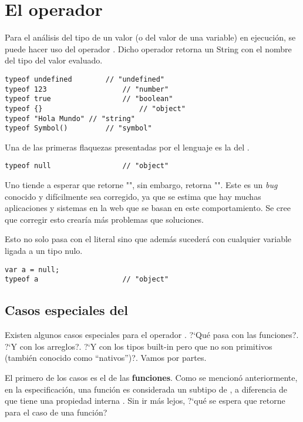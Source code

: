 \section{El operador }

Para el análisis del tipo de un valor (o del valor de una variable) en ejecución, se puede hacer uso del operador . Dicho operador retorna un String con el nombre del tipo del valor evaluado.

\begin{lstlisting}[title={Analizando los tipos con \code{typeof}}]
typeof undefined		// "undefined"
typeof 123					// "number"
typeof true					// "boolean"
typeof {}						// "object"
typeof "Hola Mundo" // "string"
typeof Symbol()			// "symbol"
\end{lstlisting}

Una de las primeras flaquezas presentadas por el lenguaje es la del . 

\begin{lstlisting}[title={Analizando \code{typeof null}}]
typeof null					// "object"
\end{lstlisting}

Uno tiende a esperar que  retorne "", sin embargo, retorna "". Este es un \textit{bug} conocido y difícilmente sea corregido, ya que se estima que hay muchas aplicaciones y sistemas en la web que se basan en este comportamiento. Se cree que corregir esto crearía más problemas que soluciones.

Esto no solo pasa con el literal  sino que además sucederá con cualquier variable ligada a un tipo nulo.

\begin{lstlisting}[title={Analizando \code{typeof null} (cont.)}]
var a = null;
typeof a					// "object"
\end{lstlisting}

\subsection{Casos especiales del }

Existen algunos casos especiales para el operador . ?`Qué pasa con las funciones?. ?`Y con los arreglos?. ?`Y con los tipos built-in pero que no son primitivos (también conocido como "`nativos"')?. Vamos por partes.

El primero de los casos es el de las \textbf{funciones}. Como se mencionó anteriormente, en la especificación, una función es considerada un subtipo de , a diferencia de que tiene una propiedad interna \code{[[Call]]}. Sin ir más lejos, ?`qué se espera que retorne  para el caso de una función?

